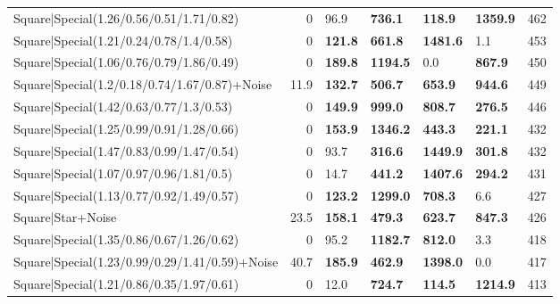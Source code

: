 \begin{tabular}{lrllllr}
 Square|Special(1.26/0.56/0.51/1.71/0.82)                      &             0   & 96.9           & \textbf{736.1}  & \textbf{118.9}  & \textbf{1359.9} &          462 \\
 Square|Special(1.21/0.24/0.78/1.4/0.58)                       &             0   & \textbf{121.8} & \textbf{661.8}  & \textbf{1481.6} & 1.1             &          453 \\
 Square|Special(1.06/0.76/0.79/1.86/0.49)                      &             0   & \textbf{189.8} & \textbf{1194.5} & 0.0             & \textbf{867.9}  &          450 \\
 Square|Special(1.2/0.18/0.74/1.67/0.87)+Noise                 &            11.9 & \textbf{132.7} & \textbf{506.7}  & \textbf{653.9}  & \textbf{944.6}  &          449 \\
 Square|Special(1.42/0.63/0.77/1.3/0.53)                       &             0   & \textbf{149.9} & \textbf{999.0}  & \textbf{808.7}  & \textbf{276.5}  &          446 \\
 Square|Special(1.25/0.99/0.91/1.28/0.66)                      &             0   & \textbf{153.9} & \textbf{1346.2} & \textbf{443.3}  & \textbf{221.1}  &          432 \\
 Square|Special(1.47/0.83/0.99/1.47/0.54)                      &             0   & 93.7           & \textbf{316.6}  & \textbf{1449.9} & \textbf{301.8}  &          432 \\
 Square|Special(1.07/0.97/0.96/1.81/0.5)                       &             0   & 14.7           & \textbf{441.2}  & \textbf{1407.6} & \textbf{294.2}  &          431 \\
 Square|Special(1.13/0.77/0.92/1.49/0.57)                      &             0   & \textbf{123.2} & \textbf{1299.0} & \textbf{708.3}  & 6.6             &          427 \\
 Square|Star+Noise                                             &            23.5 & \textbf{158.1} & \textbf{479.3}  & \textbf{623.7}  & \textbf{847.3}  &          426 \\
 Square|Special(1.35/0.86/0.67/1.26/0.62)                      &             0   & 95.2           & \textbf{1182.7} & \textbf{812.0}  & 3.3             &          418 \\
 Square|Special(1.23/0.99/0.29/1.41/0.59)+Noise                &            40.7 & \textbf{185.9} & \textbf{462.9}  & \textbf{1398.0} & 0.0             &          417 \\
 Square|Special(1.21/0.86/0.35/1.97/0.61)                      &             0   & 12.0           & \textbf{724.7}  & \textbf{114.5}  & \textbf{1214.9} &          413 \\

\end{tabular}
